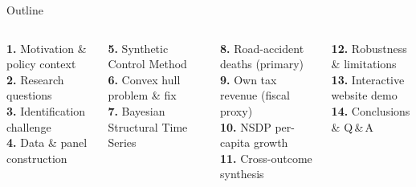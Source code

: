 \documentclass[aspectratio=169,11pt]{beamer}
\newcommand{\toptight}{\vspace{-0.15cm}}
\begin{document}
\begin{frame}{Outline}
  \toptight
  \vspace{0.4cm}
  \begin{columns}[T,onlytextwidth]
      \begin{tcolorbox}[navybox,title={\faMap\enspace Part I --- Setup}]
        \footnotesize\setlength\itemsep{2pt}
        \textbf{1.} Motivation \& policy context\\[2pt]
        \textbf{2.} Research questions\\[2pt]
        \textbf{3.} Identification challenge\\[2pt]
        \textbf{4.} Data \& panel construction
      \end{tcolorbox}
      \vspace{0.30cm}
      \begin{tcolorbox}[navybox,title={\faCalculator\enspace Part II --- Methodology}]
        \footnotesize
        \textbf{5.} Synthetic Control Method\\[2pt]
        \textbf{6.} Convex hull problem \& fix\\[2pt]
        \textbf{7.} Bayesian Structural Time Series
      \end{tcolorbox}

      \begin{tcolorbox}[navybox,title={\faChartLine\enspace Part III --- Results}]
        \footnotesize
        \textbf{8.} Road-accident deaths (primary)\\[2pt]
        \textbf{9.} Own tax revenue (fiscal proxy)\\[2pt]
        \textbf{10.} NSDP per-capita growth\\[2pt]
        \textbf{11.} Cross-outcome synthesis
      \end{tcolorbox}
      \vspace{0.30cm}
      \begin{tcolorbox}[navybox,title={\faShield*\enspace Part IV --- Closing}]
        \footnotesize
        \textbf{12.} Robustness \& limitations\\[2pt]
        \textbf{13.} Interactive website demo\\[2pt]
        \textbf{14.} Conclusions \& Q\,\&\,A
      \end{tcolorbox}
  \end{columns}
\end{frame}
\end{document}
